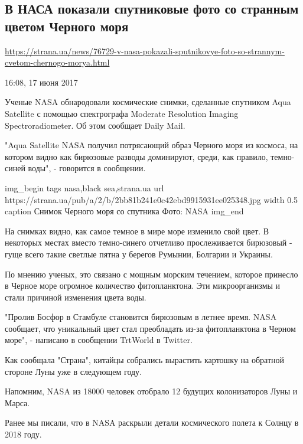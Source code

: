  
 

\subsection{В НАСА показали спутниковые фото со странным цветом Черного моря}

\url{https://strana.ua/news/76729-v-nasa-pokazali-sputnikovye-foto-so-strannym-cvetom-chernogo-morya.html}

16:08, 17 июня 2017

Ученые NASA обнародовали космические снимки, сделанные спутником Aqua Satellite
с помощью спектрографа Moderate Resolution Imaging Spectroradiometer. Об этом
сообщает Daily Mail.

"Aqua Satellite NASA получил потрясающий образ Черного моря из космоса, на
котором видно как бирюзовые разводы доминируют, среди, как правило, темно-синей
воды", - говорится в сообщении.

\ifcmt
img_begin 
	tags nasa,black sea,strana.ua
	url https://strana.ua/pub/a/2/b/2bb81b241e0c42ebd9915931ee025348.jpg
	width 0.5
	caption Снимок Черного моря со спутника Фото: NASA
img_end
\fi

На снимках видно, как самое темное в мире море изменило свой цвет. В некоторых
местах вместо темно-синего отчетливо прослеживается бирюзовый - гуще всего
такие светлые пятна у берегов Румынии, Болгарии и Украины.

По мнению ученых, это связано с мощным морским течением, которое принесло в
Черное море огромное количество фитопланктона. Эти микроорганизмы и стали
причиной изменения цвета воды.

"Пролив Босфор в Стамбуле становится бирюзовым в летнее время. NASA сообщает,
что уникальный цвет стал преобладать из-за фитопланктона в Черном море", -
написано в сообщении TrtWorld в Twitter.

Как сообщала "Страна", китайцы собрались вырастить картошку на обратной стороне
Луны уже в следующем году.

Напомним, NASA из 18000 человек отобрало 12 будущих колонизаторов Луны и Марса.

Ранее мы писали, что в NASA раскрыли детали космического полета к Солнцу в 2018
году.
